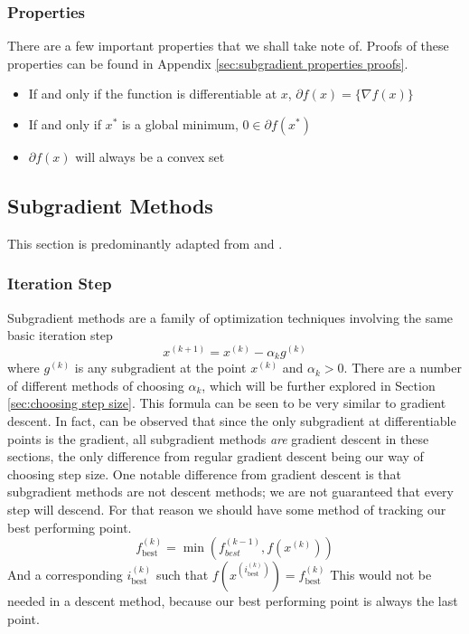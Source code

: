 \documentclass[journal,onecolumn]{IEEEtran}
\DeclareMathOperator{\best}{best}
\begin{document}
\subsubsection{Properties}
There are a few important properties that we shall take note of. Proofs of these properties can be found in Appendix \ref{sec:subgradient properties proofs}.
\begin{itemize}
    \item If and only if the function is differentiable at \(x\), \(\partial f(x) = \{\nabla f(x)\}\)
    \item If and only if \(x^*\) is a global minimum, \(0 \in \partial f(x^*)\)
    \item \(\partial f(x)\) will always be a convex set
\end{itemize}

\subsection{Subgradient Methods}\label{sec:subgradient methods}
This section is predominantly adapted from \cite{boydparksubgradients} and \cite{boydxiaosubgradients}.

\subsubsection{Iteration Step}
Subgradient methods are a family of optimization techniques involving the same basic iteration step
\begin{equation}\label{eq:subgradient method iteration}
x^{(k+1)} = x^{(k)} - \alpha_k g^{(k)}
\end{equation}
where \(g^{(k)}\) is any subgradient at the point \(x^{(k)}\) and \(\alpha_k > 0\). There are a number of different methods of choosing \(\alpha_k\), which will be further explored in Section \ref{sec:choosing step size}. This formula can be seen to be very similar to gradient descent. In fact, can be observed that since the only subgradient at differentiable points is the gradient, all subgradient methods \textit{are} gradient descent in these sections, the only difference from regular gradient descent being our way of choosing step size. One notable difference from gradient descent is that subgradient methods are not descent methods; we are not guaranteed that every step will descend. For that reason we should have some method of tracking our best performing point.
\begin{equation}\label{eq:track best}
f^{(k)}_{\best} = \min (f^{(k-1)}_{best}, f(x^{(k)}))
\end{equation}
And a corresponding \(i^{(k)}_{\best}\) such that \(f(x^{(i^{(k)}_{\best})}) = f^{(k)}_{\best}\)
This would not be needed in a descent method, because our best performing point is always the last point.
\end{document}

